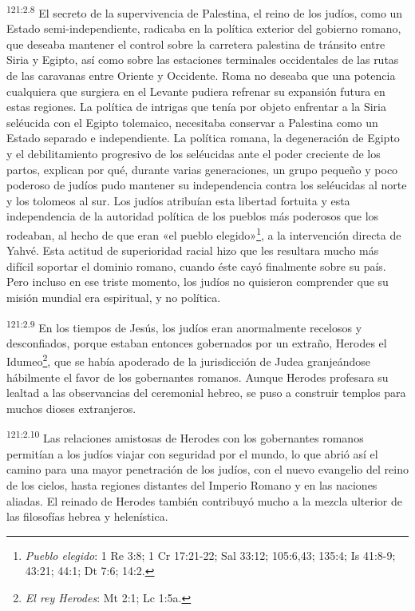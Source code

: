 \par 
\textsuperscript{121:2.8} El secreto de la supervivencia de Palestina, el reino de los judíos, como un Estado semi-independiente, radicaba en la política exterior del gobierno romano, que deseaba mantener el control sobre la carretera palestina de tránsito entre Siria y Egipto, así como sobre las estaciones terminales occidentales de las rutas de las caravanas entre Oriente y Occidente. Roma no deseaba que una potencia cualquiera que surgiera en el Levante pudiera refrenar su expansión futura en estas regiones. La política de intrigas que tenía por objeto enfrentar a la Siria seléucida con el Egipto tolemaico, necesitaba conservar a Palestina como un Estado separado e independiente. La política romana, la degeneración de Egipto y el debilitamiento progresivo de los seléucidas ante el poder creciente de los partos, explican por qué, durante varias generaciones, un grupo pequeño y poco poderoso de judíos pudo mantener su independencia contra los seléucidas al norte y los tolomeos al sur. Los judíos atribuían esta libertad fortuita y esta independencia de la autoridad política de los pueblos más poderosos que los rodeaban, al hecho de que eran «el pueblo elegido»\footnote{\textit{Pueblo elegido}: 1 Re 3:8; 1 Cr 17:21-22; Sal 33:12; 105:6,43; 135:4; Is 41:8-9; 43:21; 44:1; Dt 7:6; 14:2.}, a la intervención directa de Yahvé. Esta actitud de superioridad racial hizo que les resultara mucho más difícil soportar el dominio romano, cuando éste cayó finalmente sobre su país. Pero incluso en ese triste momento, los judíos no quisieron comprender que su misión mundial era espiritual, y no política.

\par 
\textsuperscript{121:2.9} En los tiempos de Jesús, los judíos eran anormalmente recelosos y desconfiados, porque estaban entonces gobernados por un extraño, Herodes el Idumeo\footnote{\textit{El rey Herodes}: Mt 2:1; Lc 1:5a.}, que se había apoderado de la jurisdicción de Judea granjeándose hábilmente el favor de los gobernantes romanos. Aunque Herodes profesara su lealtad a las observancias del ceremonial hebreo, se puso a construir templos para muchos dioses extranjeros.

\par 
\textsuperscript{121:2.10} Las relaciones amistosas de Herodes con los gobernantes romanos permitían a los judíos viajar con seguridad por el mundo, lo que abrió así el camino para una mayor penetración de los judíos, con el nuevo evangelio del reino de los cielos, hasta regiones distantes del Imperio Romano y en las naciones aliadas. El reinado de Herodes también contribuyó mucho a la mezcla ulterior de las filosofías hebrea y helenística.

